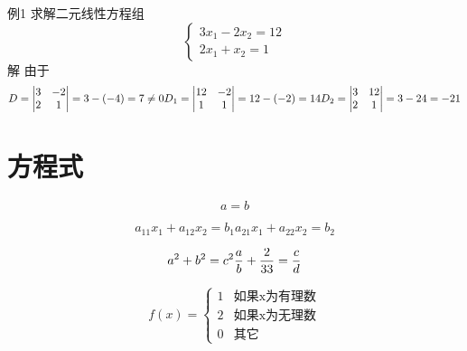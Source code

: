 例1  求解二元线性方程组
\begin{equation*}
  \begin{cases}
    3x_1-2x_2=12\\
    2x_1+x_2=1
  \end{cases}
\end{equation*}
解 由于\\
\begin{equation*}
  D=
  \begin{vmatrix}
    3 & -2\\
    2 & 1
  \end{vmatrix}
  =3-(-4)=7\neq 0\\
  D_1=
  \begin{vmatrix}
    12 & -2\\
    1 & 1
  \end{vmatrix}
  = 12 - (-2) = 14\\
  D_2=
  \begin{vmatrix}
    3 & 12\\
    2 & 1
  \end{vmatrix}
  = 3 - 24 = -21\\
\end{equation*}
\section{方程式}
\begin{equation*}
  a=b
\end{equation*}


\begin{equation}
  a_{11} x_1+a_{12}x_2 = b_1
  a_{21}x_1+a_{22}x_2 = b_2
\end{equation}

\begin{equation}
  a^2 + b^2 = c^2\\
  \frac{a}{b}+\frac2{33}=\frac{c}{d}
\end{equation}

\begin{equation} f(x) =
  \begin{cases}
    1 & \text{如果x为有理数} \\
    2 & \text{如果x为无理数} \\
    0 & \text{其它}
  \end{cases}
\end{equation}


